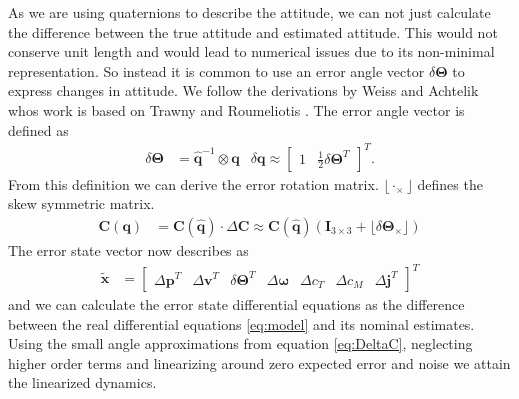 \documentclass[10pt,a4paper]{article}
\newcommand{\skewsym}[1]{\lfloor #1 _\times \rfloor}
\begin{document}
As we are using quaternions to describe the attitude, we can not just calculate the difference between the true attitude and estimated attitude. This would not conserve unit length and would lead to numerical issues due to its non-minimal representation. So instead it is common to use an error angle vector $\delta\boldsymbol{\Theta}$ to express changes in attitude. We follow the derivations by Weiss \cite{weiss2012vision} and Achtelik \cite{Achtelik2014} whos work is based on Trawny and Roumeliotis \cite{Trawny2005}. 
The error angle vector is defined as
\begin{align}
\delta\boldsymbol{\Theta} &= \hat{\mathbf{q}}^{-1} \otimes \mathbf{q} & \delta\mathbf{q} \approx \begin{bmatrix}
1 & \frac{1}{2} \delta\boldsymbol{\Theta}^T
\end{bmatrix}^T   .
\end{align}
From this definition we can derive the error rotation matrix. $\skewsym{\cdot}$ defines the skew symmetric matrix.
\begin{align}
\mathbf{C}(\mathbf{q}) &= \mathbf{C}(\hat{\mathbf{q}}) \cdot \Delta\mathbf{C} \approx  \mathbf{C}(\hat{\mathbf{q}}) \left( \mathbf{I}_{3\times3} + \skewsym{\delta\boldsymbol{\Theta}} \right) \label{eq:DeltaC}
\end{align} 
The error state vector now describes as
\begin{align}
\tilde{\mathbf{x}} &= \begin{bmatrix}
\Delta\mathbf{p}^T & \Delta\mathbf{v}^T & \delta\boldsymbol{\Theta}^T & \Delta\boldsymbol{\omega} & \Delta c_T & \Delta c_M & \Delta\mathbf{j}^T
\end{bmatrix} ^T 
\end{align}
and we can calculate the error state differential equations as the difference between the real differential equations \ref{eq:model} and its nominal estimates. Using the small angle approximations from equation \ref{eq:DeltaC}, neglecting higher order terms and linearizing around zero expected error and noise we attain the linearized dynamics.
\end{document}
